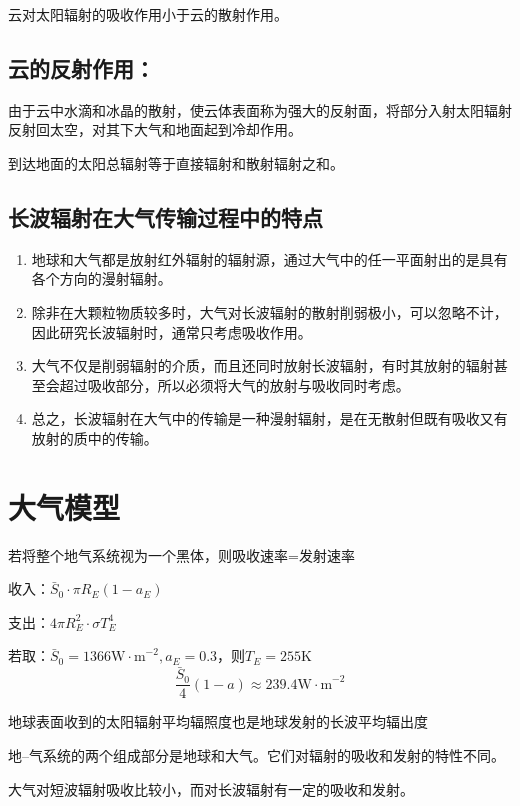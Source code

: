 \documentclass[UTF8,a4paper,11pt,oneside]{ctexbook}
\begin{document}
云对太阳辐射的吸收作用小于云的散射作用。

\subsection{云的反射作用：}

由于云中水滴和冰晶的散射，使云体表面称为强大的反射面，将部分入射太阳辐射反射回太空，对其下大气和地面起到冷却作用。

到达地面的太阳总辐射等于直接辐射和散射辐射之和。

\subsection{长波辐射在大气传输过程中的特点}
\begin{enumerate}
    \item 地球和大气都是放射红外辐射的辐射源，通过大气中的任一平面射出的是具有各个方向的漫射辐射。
    \item 除非在大颗粒物质较多时，大气对长波辐射的散射削弱极小，可以忽略不计，因此研究长波辐射时，通常只考虑吸收作用。
    \item 大气不仅是削弱辐射的介质，而且还同时放射长波辐射，有时其放射的辐射甚至会超过吸收部分，所以必须将大气的放射与吸收同时考虑。
    \item 总之，长波辐射在大气中的传输是一种漫射辐射，是在无散射但既有吸收又有放射的质中的传输。
\end{enumerate}

\section{大气模型}


若将整个地气系统视为一个黑体，则吸收速率=发射速率

收入：\(\bar{S}_0\cdot\pi{}R_E(1-a_E)\)

支出：\(4\pi{}R_E^2\cdot\sigma{}T_E^4\)

若取：\(\bar{S}_0=1366\mathrm{W\cdot{}m}^{-2},a_E=0.3\)，则\(T_E=255\mathrm{K}\)
\begin{equation}
\dfrac{\bar{S}_0}{4}(1-a)\approx239.4\mathrm{W\cdot{}m}^{-2}
\end{equation}

地球表面收到的太阳辐射平均辐照度也是地球发射的长波平均辐出度

地--气系统的两个组成部分是地球和大气。它们对辐射的吸收和发射的特性不同。

大气对短波辐射吸收比较小，而对长波辐射有一定的吸收和发射。
\end{document}
